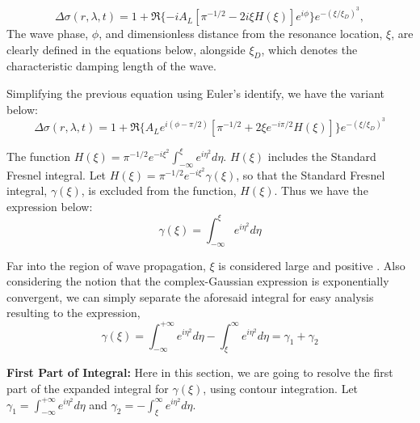 \documentclass{article}
\begin{document}
\vspace{2}

\begin{equation}
\Delta \sigma(r,\lambda,t) = 1 + \Re\{-iA_{L}[\pi^{-1/2}-2i\xi H(\xi)]e^{i\phi}\}e^{-(\xi /\xi_{D})^{3}},
\end{equation}
The wave phase, $\phi$, and dimensionless distance from the resonance location, $\xi$, are clearly defined in the equations below, alongside $\xi_{D}$, which denotes the characteristic damping length of the wave. 

\vspace{2}
Simplifying the previous equation using Euler's identify, we have the variant below:
\begin{equation}
\Delta \sigma(r,\lambda,t) = 1 + \Re\{A_{L}e^{i(\phi-\pi/2)}[\pi^{-1/2}+2\xi e^{-i\pi/2}H(\xi)]\}e^{-(\xi/\xi_{D})^{3}}
\end{equation}

\vspace{2}

The function $H(\xi) = \pi^{-1/2}e^{-i\xi^{2}}\int_{-\infty}^{\xi}e^{i\eta^{2}}d\eta$. $H(\xi)$ includes the Standard Fresnel integral. Let $H(\xi) = \pi^{-1/2}e^{-i\xi^{2}}\gamma(\xi)$, so that the Standard Fresnel integral, $\gamma(\xi)$, is excluded from the function, $H(\xi)$. Thus we have the expression below:
\begin{equation}
    \gamma(\xi) = \int_{-\infty}^{\xi}e^{i\eta^{2}}d\eta
\end{equation}


Far into the region of wave propagation, $\xi$ is considered large and positive  \cite{Nicholson1990AnAR} \cite{1984prin.conf..513S}. Also considering the notion that the complex-Gaussian expression is exponentially convergent, we can simply separate the aforesaid integral for easy analysis resulting to the expression,
\begin{equation}
    \gamma(\xi) = \int_{-\infty}^{+ \infty}e^{i\eta^{2}}d\eta - \int_{\xi}^{\infty}e^{i\eta^{2}}d\eta = \gamma_{1} + \gamma_{2}
\end{equation}

\textbf{First Part of Integral:}
Here in this section, we are going to resolve the first part of the expanded integral for $\gamma(\xi)$, using contour integration. Let $\gamma_{1} = \int_{-\infty}^{+ \infty}e^{i\eta^{2}}d\eta$ and $\gamma_{2} = - \int_{\xi}^{\infty}e^{i\eta^{2}}d\eta$.
\end{document}
